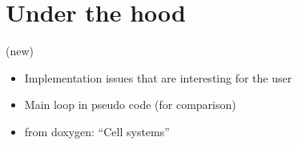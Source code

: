 \chapter{Under the hood}
\label{chap:underhood}

(new)

\begin{itemize}
\item Implementation issues that are interesting for the user
\item Main loop in pseudo code (for comparison)
\item from doxygen: ``Cell systems'' 
\end{itemize}

